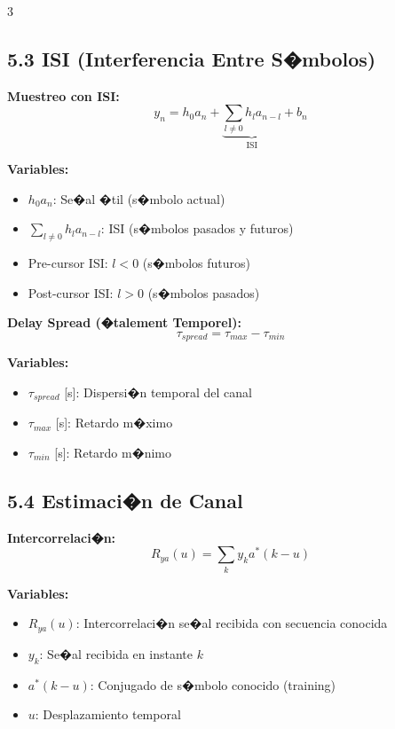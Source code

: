 ﻿\documentclass[8pt,a4paper]{article}
\begin{document}
\begin{multicols}{3}
\vspace{-2mm}
\subsection*{\small 5.3 ISI (Interferencia Entre S�mbolos)}
\vspace{-2mm}

\textbf{Muestreo con ISI:}
\[
y_n = h_0 a_n + \underbrace{\sum_{l \neq 0} h_l a_{n-l}}_{\text{ISI}} + b_n
\]

\textbf{Variables:}
\begin{itemize}[leftmargin=*,itemsep=0pt]
    \item $h_0 a_n$: Se�al �til (s�mbolo actual)
    \item $\sum_{l \neq 0} h_l a_{n-l}$: ISI (s�mbolos pasados y futuros)
    \item Pre-cursor ISI: $l < 0$ (s�mbolos futuros)
    \item Post-cursor ISI: $l > 0$ (s�mbolos pasados)
\end{itemize}

\textbf{Delay Spread (�talement Temporel):}
\[
\tau_{spread} = \tau_{max} - \tau_{min}
\]

\textbf{Variables:}
\begin{itemize}[leftmargin=*,itemsep=0pt]
    \item $\tau_{spread}$ [s]: Dispersi�n temporal del canal
    \item $\tau_{max}$ [s]: Retardo m�ximo
    \item $\tau_{min}$ [s]: Retardo m�nimo
\end{itemize}

\vspace{-2mm}
\subsection*{\small 5.4 Estimaci�n de Canal}
\vspace{-2mm}

\textbf{Intercorrelaci�n:}
\[
R_{ya}(u) = \sum_k y_k a^*(k-u)
\]

\textbf{Variables:}
\begin{itemize}[leftmargin=*,itemsep=0pt]
    \item $R_{ya}(u)$: Intercorrelaci�n se�al recibida con secuencia conocida
    \item $y_k$: Se�al recibida en instante $k$
    \item $a^*(k-u)$: Conjugado de s�mbolo conocido (training)
    \item $u$: Desplazamiento temporal
\end{itemize}


\end{multicols}
\end{document}
